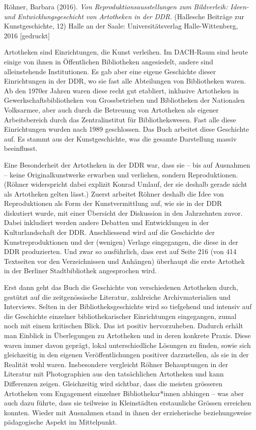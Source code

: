 \documentclass[a4paper,
fontsize=11pt,
oneside,
numbers=noperiodatend,
parskip=half-,
bibliography=totoc,
final
]{scrartcl}
\begin{document}
Röhner, Barbara (2016). \emph{Von Reproduktionsausstellungen zum
Bildverleih: Ideen- und Entwicklungsgeschicht von Artotheken in der
DDR.} (Hallesche Beiträge zur Kunstgeschichte, 12) Halle an der Saale:
Universitätsverlag Halle-Wittenberg, 2016 {[}gedruckt{]}

Artotheken sind Einrichtungen, die Kunst verleihen. Im DACH-Raum sind
heute einige von ihnen in Öffentlichen Bibliotheken angesiedelt, andere
sind alleinstehende Institutionen. Es gab aber eine eigene Geschichte
dieser Einrichtungen in der DDR, wo sie fast alle Abteilungen von
Bibliotheken waren. Ab den 1970er Jahren waren diese recht gut
etabliert, inklusive Artotheken in Gewerkschaftsbibliotheken von
Grossbetrieben und Bibliotheken der Nationalen Volksarmee, aber auch
durch die Betreuung von Artotheken als eigener Arbeitsbereich durch das
Zentralinstitut für Bibliothekswesen. Fast alle diese Einrichtungen
wurden nach 1989 geschlossen. Das Buch arbeitet diese Geschichte auf. Es
stammt aus der Kunstgeschichte, was die gesamte Darstellung massiv
beeinflusst.

Eine Besonderheit der Artotheken in der DDR war, dass sie – bis auf
Ausnahmen – keine Originalkunstwerke erwarben und verliehen, sondern
Reproduktionen. (Röhner widerspricht dabei explizit Konrad Umlauf, der
sie deshalb gerade nicht als Artotheken gelten lässt.) Zuerst arbeitet
Röhner deshalb die Idee von Reproduktionen als Form der Kunstvermittlung
auf, wie sie in der DDR diskutiert wurde, mit einer Übersicht der
Diskussion in den Jahrzehnten zuvor. Dabei inkludiert werden andere
Debatten und Entwicklungen in der Kulturlandschaft der DDR.
Anschliessend wird auf die Geschichte der Kunstreproduktionen und der
(wenigen) Verlage eingegangen, die diese in der DDR produzierten. Und
zwar so ausführlich, dass erst auf Seite 216 (von 414 Textseiten vor den
Verzeichnissen und Anhängen) überhaupt die erste Artothek in der
Berliner Stadtbibliothek angesprochen wird.

Erst dann geht das Buch die Geschichte von verschiedenen Artotheken
durch, gestützt auf die zeitgenössische Literatur, zahlreiche
Archivmaterialien und Interviews. Selten in der Bibliotheksgeschichte
wird so tiefgehend und intensiv auf die Geschichte einzelner
bibliothekarischer Einrichtungen eingegangen, zumal noch mit einem
kritischen Blick. Das ist positiv hervorzuheben. Dadurch erhält man
Einblick in Überlegungen zu Artotheken und in deren konkrete Praxis.
Diese waren immer davon geprägt, lokal unterschiedliche Lösungen zu
finden, sowie sich gleichzeitig in den eigenen Veröffentlichungen
positiver darzustellen, als sie in der Realität wohl waren. Insbesondere
vergleicht Röhner Behauptungen in der Literatur mit Photographien aus
den tatsächlichen Artotheken und kann Differenzen zeigen. Gleichzeitig
wird sichtbar, dass die meisten grösseren Artotheken vom Engagement
einzelner Bibliothekar*innen abhingen – was aber auch dazu führte, dass
sie teilweise in Kleinstädten erstaunliche Grössen erreichen konnten.
Wieder mit Ausnahmen stand in ihnen der erzieherische beziehungsweise
pädagogische Aspekt im Mittelpunkt.
\end{document}
